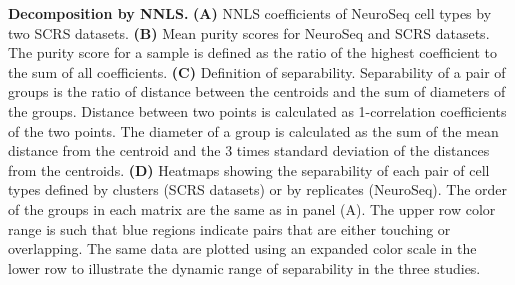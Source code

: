 \textbf{Decomposition by NNLS.}
\textbf{(A)} NNLS coefficients of NeuroSeq cell types by two SCRS datasets.
\textbf{(B)} Mean purity scores for NeuroSeq and SCRS datasets. The purity score for a sample is defined as the ratio of the highest coefficient to the sum of all coefficients.
\textbf{(C)} Definition of separability. Separability of a pair of groups is the ratio of distance between the centroids and the sum of diameters of the groups. Distance between two points is calculated as 1-correlation coefficients of the two points. The diameter of a group is calculated as the sum of the mean distance from the centroid and the 3 times standard deviation of the distances from the centroids. 
\textbf{(D)} Heatmaps showing the separability of each pair of cell types defined by clusters (SCRS datasets) or by replicates (NeuroSeq). The order of the groups in each matrix are the same as in panel (A). The upper row color range is such that blue regions indicate pairs that are either touching or overlapping. The same data are plotted using an expanded color scale in the lower row to illustrate the dynamic range of separability in the three studies. 